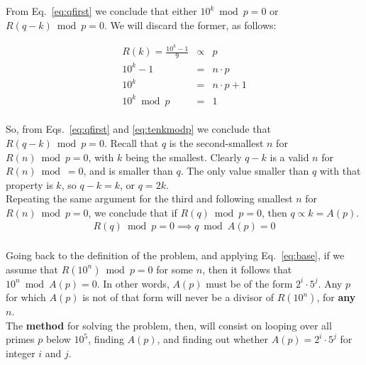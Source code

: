 \documentclass[english]{article}
\begin{document}
From Eq.~\ref{eq:qfirst} we conclude that either $10^k \bmod p = 0$ or $R(q-k) \bmod p = 0$. We will discard the former, as follows:

\begin{eqnarray}
 R(k) = \frac{10^k - 1}{9} & \propto & p \\
10^k - 1 & = & n\cdot p \\
10^k & = & n\cdot p + 1 \\
10^k \bmod p & = & 1 \label{eq:tenkmodp}
\end{eqnarray}\\

So, from Eqs.~\ref{eq:qfirst} and \ref{eq:tenkmodp} we conclude that $R(q-k) \bmod p = 0$. Recall that $q$ is the second-smallest $n$ for $R(n) \bmod p = 0$, with $k$ being the smallest. Clearly $q-k$ is a valid $n$ for $R(n) \bmod = 0$, and is smaller than $q$. The only value smaller than $q$ with that property is $k$, so $q - k = k$, or $q = 2k$.\\

Repeating the same argument for the third and following smallest $n$ for $R(n) \bmod p = 0$, we conclude that if $R(q) \bmod p = 0$, then $q \propto k = A(p)$.\\

\begin{eqnarray}
R(q) \bmod p = 0 \implies q \bmod A(p) = 0 \label{eq:base}
\end{eqnarray}\\

Going back to the definition of the problem, and applying Eq.~\ref{eq:base}, if we assume that $R(10^n) \bmod p = 0$ for some $n$, then it follows that $10^n \bmod A(p) = 0$. In other words, $A(p)$ must be of the form $2^i\cdot 5^j$. Any $p$ for which $A(p)$ is not of that form will never be a divisor of $R(10^n)$, for {\bf any} $n$.\\

The {\bf method} for solving the problem, then, will consist on looping over all primes $p$ below $10^5$, finding $A(p)$, and finding out whether $A(p) = 2^i\cdot 5^j$ for integer $i$ and $j$.
\end{document}

